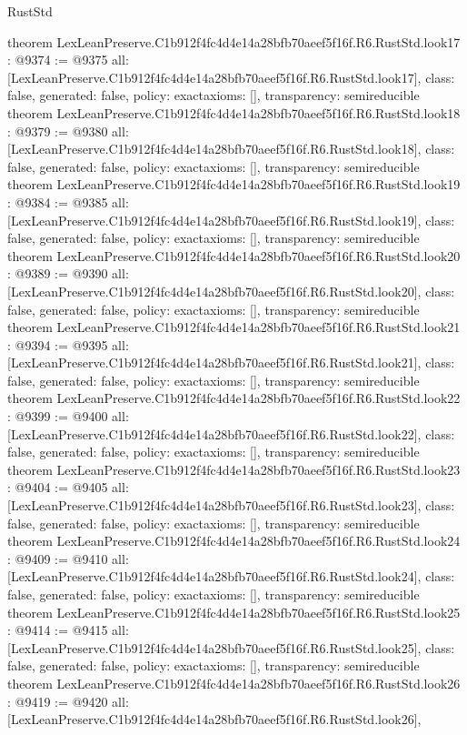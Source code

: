 \begin{lexlean}{RustStd}
\begin{coremodule}
theorem LexLeanPreserve.C1b912f4fc4d4e14a28bfb70aeef5f16f.R6.RustStd.look17 : @9374 := @9375 {
  all: [LexLeanPreserve.C1b912f4fc4d4e14a28bfb70aeef5f16f.R6.RustStd.look17],
  class: false,
  generated: false,
  policy: exact{axioms: []},
  transparency: semireducible
}
theorem LexLeanPreserve.C1b912f4fc4d4e14a28bfb70aeef5f16f.R6.RustStd.look18 : @9379 := @9380 {
  all: [LexLeanPreserve.C1b912f4fc4d4e14a28bfb70aeef5f16f.R6.RustStd.look18],
  class: false,
  generated: false,
  policy: exact{axioms: []},
  transparency: semireducible
}
theorem LexLeanPreserve.C1b912f4fc4d4e14a28bfb70aeef5f16f.R6.RustStd.look19 : @9384 := @9385 {
  all: [LexLeanPreserve.C1b912f4fc4d4e14a28bfb70aeef5f16f.R6.RustStd.look19],
  class: false,
  generated: false,
  policy: exact{axioms: []},
  transparency: semireducible
}
theorem LexLeanPreserve.C1b912f4fc4d4e14a28bfb70aeef5f16f.R6.RustStd.look20 : @9389 := @9390 {
  all: [LexLeanPreserve.C1b912f4fc4d4e14a28bfb70aeef5f16f.R6.RustStd.look20],
  class: false,
  generated: false,
  policy: exact{axioms: []},
  transparency: semireducible
}
theorem LexLeanPreserve.C1b912f4fc4d4e14a28bfb70aeef5f16f.R6.RustStd.look21 : @9394 := @9395 {
  all: [LexLeanPreserve.C1b912f4fc4d4e14a28bfb70aeef5f16f.R6.RustStd.look21],
  class: false,
  generated: false,
  policy: exact{axioms: []},
  transparency: semireducible
}
theorem LexLeanPreserve.C1b912f4fc4d4e14a28bfb70aeef5f16f.R6.RustStd.look22 : @9399 := @9400 {
  all: [LexLeanPreserve.C1b912f4fc4d4e14a28bfb70aeef5f16f.R6.RustStd.look22],
  class: false,
  generated: false,
  policy: exact{axioms: []},
  transparency: semireducible
}
theorem LexLeanPreserve.C1b912f4fc4d4e14a28bfb70aeef5f16f.R6.RustStd.look23 : @9404 := @9405 {
  all: [LexLeanPreserve.C1b912f4fc4d4e14a28bfb70aeef5f16f.R6.RustStd.look23],
  class: false,
  generated: false,
  policy: exact{axioms: []},
  transparency: semireducible
}
theorem LexLeanPreserve.C1b912f4fc4d4e14a28bfb70aeef5f16f.R6.RustStd.look24 : @9409 := @9410 {
  all: [LexLeanPreserve.C1b912f4fc4d4e14a28bfb70aeef5f16f.R6.RustStd.look24],
  class: false,
  generated: false,
  policy: exact{axioms: []},
  transparency: semireducible
}
theorem LexLeanPreserve.C1b912f4fc4d4e14a28bfb70aeef5f16f.R6.RustStd.look25 : @9414 := @9415 {
  all: [LexLeanPreserve.C1b912f4fc4d4e14a28bfb70aeef5f16f.R6.RustStd.look25],
  class: false,
  generated: false,
  policy: exact{axioms: []},
  transparency: semireducible
}
theorem LexLeanPreserve.C1b912f4fc4d4e14a28bfb70aeef5f16f.R6.RustStd.look26 : @9419 := @9420 {
  all: [LexLeanPreserve.C1b912f4fc4d4e14a28bfb70aeef5f16f.R6.RustStd.look26],
}
\end{coremodule}
\end{lexlean}
